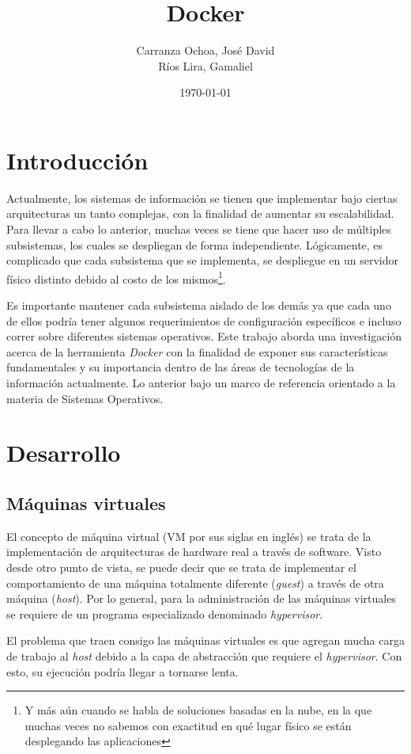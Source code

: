 \documentclass[12pt, letterpaper]{article}
\title{Docker}
\author{Carranza Ochoa, José David \\ Ríos Lira, Gamaliel}
\date{\today}
\begin{document}
\maketitle

\section{Introducción}
Actualmente, los sistemas de información se tienen que implementar bajo 
ciertas arquitecturas un tanto complejas, con la finalidad de aumentar su 
escalabilidad. Para llevar a cabo lo anterior, muchas veces se tiene que hacer 
uso de múltiples subsistemas, los cuales se despliegan de forma independiente.  
Lógicamente, es complicado que cada subsistema que se implementa, se 
despliegue en un servidor físico distinto debido al costo de los 
mismos\footnote{Y más aún cuando se habla de soluciones basadas en la nube, en 
la que muchas veces no sabemos con exactitud en qué lugar físico se están 
desplegando las aplicaciones}.

Es importante mantener cada subsistema aislado de los demás ya que cada uno de 
ellos podría tener algunos requerimientos de configuración específicos e 
incluso correr sobre diferentes sistemas operativos. Este trabajo aborda una 
investigación acerca de la herramienta \textit{Docker} con la finalidad de 
exponer sus características fundamentales y su importancia dentro de las áreas 
de tecnologías de la información actualmente. Lo anterior bajo un marco de 
referencia orientado a la materia de Sistemas Operativos.

\section{Desarrollo}
\subsection{Máquinas virtuales}
El concepto de máquina virtual (VM por sus siglas en inglés) se trata de la 
implementación de arquitecturas de hardware real a través de software. Visto 
desde otro punto de vista, se puede decir que se trata de implementar el 
comportamiento de una máquina totalmente diferente (\textit{guest}) a través 
de otra máquina (\textit{host}). Por lo general, para la administración de las 
máquinas virtuales se requiere de un programa especializado denominado 
\textit{hypervisor}.

El problema que traen consigo las máquinas virtuales es que agregan mucha 
carga de trabajo al \textit{host} debido a la capa de abstracción que requiere 
el \textit{hypervisor}. Con esto, su ejecución podría llegar a tornarse lenta.
\end{document}
